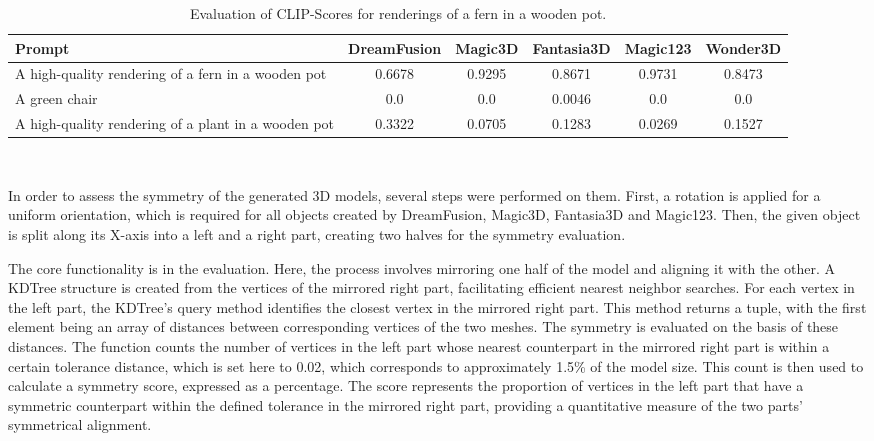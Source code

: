 \begin{table}[htbp]
    \centering
    \small
    \begin{tabular}{m{4cm}S[table-format=1.2]S[table-format=1.2]S[table-format=1.2]S[table-format=1.2]S[table-format=1.2]}
    \toprule
    {Prompt} & {DreamFusion} & {Magic3D} & {Fantasia3D} & {Magic123} & {Wonder3D} \\
    \midrule
    A high-quality rendering of a fern in a wooden pot & 0.6678 & 0.9295 & 0.8671 & 0.9731 & 0.8473 \\
    \midrule
    A green chair & 0.0 & 0.0 & 0.0046 & 0.0 & 0.0 \\
    \midrule
    A high-quality rendering of a plant in a wooden pot & 0.3322 & 0.0705 & 0.1283 & 0.0269 & 0.1527 \\
    \bottomrule 
    \end{tabular}
    \caption{Evaluation of CLIP-Scores for renderings of a fern in a wooden pot.}~\label{table:scoreFern}
\end{table}

In order to assess the symmetry of the generated 3D models, several steps were performed on them. First, a rotation is applied for a uniform orientation, which is required for all objects created by DreamFusion, Magic3D, Fantasia3D and Magic123. Then, the given object is split along its X-axis into a left and a right part, creating two halves for the symmetry evaluation.

The core functionality is in the evaluation. Here, the process involves mirroring one half of the model and aligning it with the other. A KDTree structure is created from the vertices of the mirrored right part, facilitating efficient nearest neighbor searches. For each vertex in the left part, the KDTree's query method identifies the closest vertex in the mirrored right part. This method returns a tuple, with the first element being an array of distances between corresponding vertices of the two meshes. The symmetry is evaluated on the basis of these distances. The function counts the number of vertices in the left part whose nearest counterpart in the mirrored right part is within a certain tolerance distance, which is set here to 0.02, which corresponds to approximately 1.5\% of the model size. This count is then used to calculate a symmetry score, expressed as a percentage. The score represents the proportion of vertices in the left part that have a symmetric counterpart within the defined tolerance in the mirrored right part, providing a quantitative measure of the two parts' symmetrical alignment.

